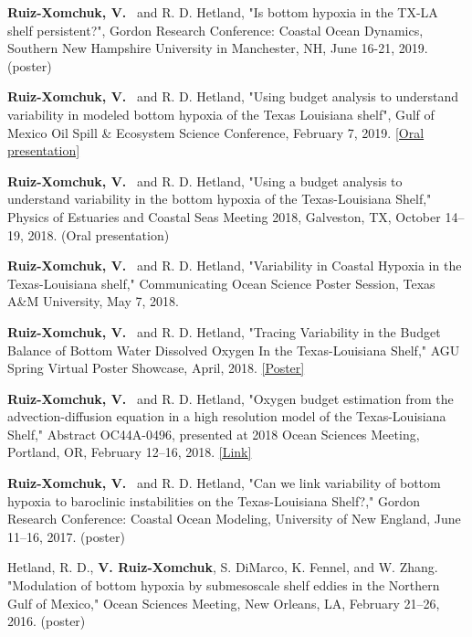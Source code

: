 \documentclass[10pt,letterpaper]{article}
\newcommand{\vrx}{\textbf{V. Ruiz-Xomchuk}}
\newcommand{\rxv}{\textbf{Ruiz-Xomchuk, V.}}
\renewenvironment{itemize}{
  \begin{list}{}{
    \setlength{\leftmargin}{1.5em}
    \setlength{\itemsep}{0.25em}
    \setlength{\parskip}{0pt}
    \setlength{\parsep}{0.25em}
  }
}{
  \end{list}
}
\begin{document}
\begin{itemize}

\item \rxv~ and R. D. Hetland, "Is bottom hypoxia in the TX-LA shelf persistent?", Gordon Research Conference: Coastal Ocean Dynamics, Southern New Hampshire University in Manchester, NH, June 16-21, 2019. (poster)

\item \rxv~ and R. D. Hetland, "Using budget analysis to understand variability in modeled bottom hypoxia of the Texas Louisiana shelf",  Gulf of Mexico Oil Spill \& Ecosystem Science Conference, February 7, 2019. \href{http://gulfresearchinitiative.org/wp-content/uploads/oral-abstracts.pdf}{[Oral presentation]}

\item \rxv~ and R. D. Hetland, "Using a budget analysis to understand variability in the bottom hypoxia of the Texas-Louisiana Shelf," Physics of Estuaries and Coastal Seas Meeting 2018, Galveston, TX, October 14--19, 2018. (Oral presentation)

\item \rxv~ and R. D. Hetland, "Variability in Coastal Hypoxia in the Texas-Louisiana shelf," Communicating Ocean Science Poster Session, Texas A\&M University, May 7, 2018.

\item \rxv~ and R. D. Hetland, "Tracing Variability in the Budget Balance of Bottom Water Dissolved Oxygen In the Texas-Louisiana Shelf," AGU Spring Virtual Poster Showcase, April, 2018. \href{https://education.agu.org/files/2018/05/2nd_Grad_VeronicaRuizXomchuk.pdf}{[Poster]}

\item \rxv~ and R. D. Hetland, "Oxygen budget estimation from the advection-diffusion equation in a high resolution model of the Texas-Louisiana Shelf," Abstract OC44A-0496, presented at 2018 Ocean Sciences Meeting, Portland, OR, February 12--16, 2018. \href{https://agu.confex.com/agu/os18/meetingapp.cgi/Paper/326839}{[Link]}

\item \rxv~ and R. D. Hetland, "Can we link variability of bottom hypoxia to baroclinic instabilities
on the Texas-Louisiana Shelf?," Gordon Research Conference: Coastal Ocean Modeling, University of New England, June 11--16, 2017. (poster)

\item Hetland, R. D., \vrx, S. DiMarco, K. Fennel, and W. Zhang. "Modulation of bottom hypoxia by submesoscale shelf eddies in the Northern Gulf of Mexico," Ocean Sciences Meeting, New Orleans, LA, February 21--26, 2016. (poster)

\end{itemize}
\end{document}
